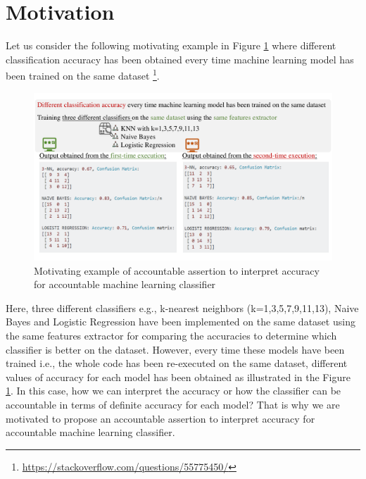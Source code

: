 \section{Motivation}
\label{sec:motivation}

Let us consider the following motivating example in Figure \ref{fig:motiv} where different classification accuracy has been obtained every time machine learning model has been trained on the same dataset  \footnote{\small \url{https://stackoverflow.com/questions/55775450/}}. 
\begin{figure}[h]
	\includegraphics[width=\linewidth]{motivfigure.pdf}
	\caption{Motivating example of accountable assertion to interpret accuracy for accountable machine learning classifier}
	\label{fig:motiv}
\end{figure}
Here, three different classifiers e.g., k-nearest neighbors (k=1,3,5,7,9,11,13), Naive Bayes and Logistic Regression have been implemented on the same dataset using the same features extractor for comparing the accuracies to determine which classifier is better on the dataset. However, every time these models have been trained i.e., the whole code has been re-executed on the same dataset, different values of accuracy for each model has been obtained as illustrated in the Figure \ref{fig:motiv}. In this case, how we can interpret the accuracy or how the classifier can be accountable in terms of definite accuracy for each model? That is why we are motivated to propose an accountable assertion to interpret accuracy for accountable machine learning classifier.  

%
%
%
%
%
